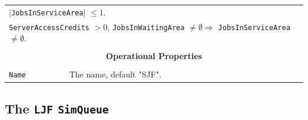 \documentclass[12pt]{book}
\begin{document}
\begin{tabular}{|l|l|l|l|}
\multicolumn{4}{|l|}{$|$\lstinline|JobsInServiceArea|$|$ $\leq 1$.} \\
\multicolumn{4}{|l|}{\lstinline|ServerAccessCredits| $> 0$, \lstinline|JobsInWaitingArea| $\neq \emptyset
                     \Rightarrow$ \lstinline|JobsInServiceArea| $\neq \emptyset$.} \\
\hline
\multicolumn{4}{|c|}{} \\
\multicolumn{4}{|c|}{\bf Operational Properties} \\
\multicolumn{4}{|c|}{} \\
\hline
\lstinline|Name| & \multicolumn{3}{|l|}{The name, default "SJF".} \\
\hline
\end{tabular}

\subsection{The \lstinline{LJF} \lstinline{SimQueue}}
\label{sec:LJF}
 
\end{document}
